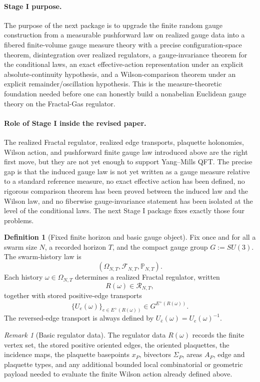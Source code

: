 \documentclass[11pt]{article}
\theoremstyle{definition}
\newtheorem{definition}[theorem]{Definition}
\theoremstyle{remark}
\newtheorem{remark}[theorem]{Remark}
\begin{document}
\paragraph{Stage I purpose.}
The purpose of the next package is to upgrade the finite random gauge
construction from a measurable pushforward law on realized gauge data into a
fibered finite-volume gauge measure theory with a precise configuration-space
theorem, disintegration over realized regulators, a gauge-invariance theorem
for the conditional laws, an exact effective-action representation under an
explicit absolute-continuity hypothesis, and a Wilson-comparison theorem under
an explicit remainder/oscillation hypothesis. This is the measure-theoretic
foundation needed before one can honestly build a nonabelian Euclidean gauge
theory on the Fractal-Gas regulator.

\paragraph{Role of Stage I inside the revised paper.}
The realized Fractal regulator, realized edge transports, plaquette holonomies,
Wilson action, and pushforward finite gauge law introduced above are the right
first move, but they are not yet enough to support Yang--Mills QFT. The precise
gap is that the induced gauge law is not yet written as a gauge measure
relative to a standard reference measure, no exact effective action has been
defined, no rigorous comparison theorem has been proved between the induced law
and the Wilson law, and no fiberwise gauge-invariance statement has been
isolated at the level of the conditional laws. The next Stage I package fixes
exactly those four problems.

\begin{definition}[Fixed finite horizon and basic gauge object]
\label{def:fixed-finite-horizon}
Fix once and for all a swarm size \(N\), a recorded horizon \(T\), and the
compact gauge group \(G:=SU(3)\). The swarm-history law is
\[
(\Omega_{N,T},\mathcal F_{N,T},\mathbb P_{N,T}).
\]
Each history \(\omega\in\Omega_{N,T}\) determines a realized Fractal regulator,
written
\[
R(\omega)\in\mathscr R_{N,T},
\]
together with stored positive-edge transports
\[
\{U_e(\omega)\}_{e\in E^+(R(\omega))}\in G^{E^+(R(\omega))}.
\]
The reversed-edge transport is always defined by \(U_{\bar e}(\omega)=U_e(\omega)^{-1}\).
\end{definition}

\begin{remark}[Basic regulator data]
\label{rem:basic-regulator-data}
The regulator data \(R(\omega)\) records the finite vertex set, the stored
positive oriented edges, the oriented plaquettes, the incidence maps, the
plaquette basepoints \(x_P\), bivectors \(\Sigma_P\), areas \(A_P\), edge and
plaquette types, and any additional bounded local combinatorial or geometric
payload needed to evaluate the finite Wilson action already defined above.
\end{remark}
\end{document}
